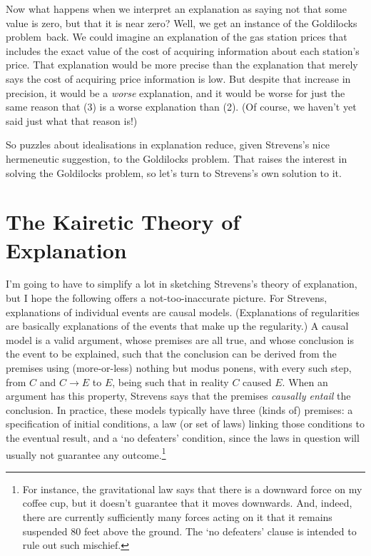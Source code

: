 \documentclass[
  10pt,
  letterpaper,
  DIV=11,
  numbers=noendperiod,
  twoside]{scrartcl}
\begin{document}
Now what happens when we interpret an explanation as saying not that
some value is zero, but that it is near zero? Well, we get an instance
of the Goldilocks problem~back. We could imagine an explanation of the
gas station prices that includes the exact value of the cost of
acquiring information about each station's price. That explanation would
be more precise than the explanation that merely says the cost of
acquiring price information is low. But despite that increase in
precision, it would be a \emph{worse} explanation, and it would be worse
for just the same reason that (3) is a worse explanation than (2). (Of
course, we haven't yet said just what that reason is!)

So puzzles about idealisations in explanation reduce, given Strevens's
nice hermeneutic suggestion, to the Goldilocks problem. That raises the
interest in solving the Goldilocks problem, so let's turn to Strevens's
own solution to it.

\section{The Kairetic Theory of
Explanation}\label{the-kairetic-theory-of-explanation}

I'm going to have to simplify a lot in sketching Strevens's theory of
explanation, but I hope the following offers a not-too-inaccurate
picture. For Strevens, explanations of individual events are causal
models. (Explanations of regularities are basically explanations of the
events that make up the regularity.) A causal model is a valid argument,
whose premises are all true, and whose conclusion is the event to be
explained, such that the conclusion can be derived from the premises
using (more-or-less) nothing but modus ponens, with every such step,
from \(C\) and \(C \rightarrow E\) to \(E\), being such that in reality
\(C\) caused \(E\). When an argument has this property, Strevens says
that the premises \emph{causally entail} the conclusion. In practice,
these models typically have three (kinds of) premises: a specification
of initial conditions, a law (or set of laws) linking those conditions
to the eventual result, and a `no defeaters' condition, since the laws
in question will usually not guarantee any outcome.\footnote{For
  instance, the gravitational law says that there is a downward force on
  my coffee cup, but it doesn't guarantee that it moves downwards. And,
  indeed, there are currently sufficiently many forces acting on it that
  it remains suspended 80 feet above the ground. The `no defeaters'
  clause is intended to rule out such mischief.}
\end{document}
